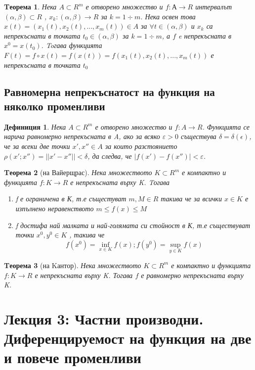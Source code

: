 \documentclass[fleqn]{article}
\newtheorem{theorem}{Tеорема}[subsection]
\newtheorem{definition}{Дефиниция}[subsection]
\begin{document}
	\begin{theorem}
Нека $A \subset R^m$ е отворено множество и $f: А \rightarrow R$ интервалът $(\alpha, \beta) \subset R$ , $x_k: (\alpha, \beta) \rightarrow R$ за $k = 1 \div m$. Нека освен това $x(t) = (x_1(t), x_2(t), ... , x_m(t)) \in A$ за $\forall t \in (\alpha, \beta)$ и $x_k$ са непрекъснати в точката $t_0 \in (\alpha, \beta) $  за $k = 1 \div m$, а $f$ e непрекъсната в $x^0 = x(t_0)$. Toгава функцията $F(t) = f \circ x(t) = f(x(t)) = f(x_1(t), x_2(t), ... , x_m(t))$ е непрекъсната в точката $t_0$
	\end{theorem}

\subsection{Равномерна непрекъснатост на функция на няколко променливи}
	\begin{definition}
Нека $A \subset R^m$ е отворено множество и $f: A \rightarrow R$. Функцията се нарича равномерно непрекъсната в A, ако за  всяко $\varepsilon > 0$ съществува $\delta = \delta(\epsilon)$, че за всеки две точки $x', x'' \in A$ за които разстоянието $\rho(x';x'') =|| x' - x'' || < \delta $, да следва, че $|f(x') - f(x'') | < \varepsilon$.
	\end{definition}

	\begin{theorem}[на Вайерщрас]
Нека множеството $K \subset R^m$ е компактно и функцията $f: K \rightarrow R$ е непрекъсната върху K. Tогава 
	\begin{enumerate}
		\item f е ограничена в К, т.е същестуват $m, M \in R$ такива че за всички $x \in K$ е изпълнено неравенството
$m \leq f(x) \leq M$
		\item f достифа най малката и най-голямата си стойност в К, т.е съществуват точки $x^0, y^0 \in K$ , такива че
$$f(x^0) = \inf _{x \in K}f(x) ; f(y^0) = \sup_{y \in K} f(x)$$
	\end{enumerate}
	\end{theorem}

	\begin{theorem}[на Kантор]
Нека множеството $K \subset R^m$ е компактно и функцията $f: K \rightarrow R$ е непрекъсната върху K. Тогава $f$ е равномерно непрекъсната върху K.
	\end{theorem}

\section{Лекция 3: Частни производни. Диференцируемост на функция на две и повече променливи }
 
\end{document}
